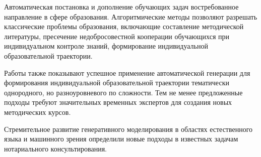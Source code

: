 Автоматическая постановка и дополнение обучающих задач востребованное направление в сфере образования. 
Алгоритмические методы позволяют разрешать классические проблемы образования,
включающие составление методической литературы,
пресечение недобросовестной кооперации обучающихся при  индивидуальном контроле знаний,
формирование индивидуальной образовательной траектории.

Работы также показывают успешное применение автоматической генерации для формирования индивидуальной образовательной траектории
тематически однородного, но разноуровневого по сложности. Тем не менее предложенные подходы
требуют значительных временных экспертов для создания новых методических курсов. 

Стремительное развитие генеративного моделирования в областях естественного языка \cite{radford2019language} 
и машинного зрения \cite{rombach2022highresolution}\cite{song2020generative} определили
новые подходы в известных задачам нотариального консультирования. 